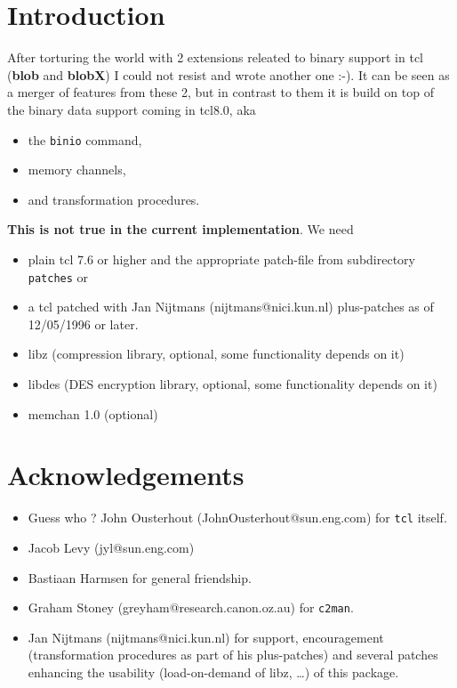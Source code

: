 \def\strong#1{{\bf #1}}
\def\lang#1{{\tt #1}}
\def\file#1{{\tt #1}}
\def\arg#1{{\tt $<$#1$>$}}
\def\trf{\strong {trf}}
\def\blob{\strong {blob}}
\def\blobx{\strong {blobX}}
\def\tcl{\lang {tcl}}
\def\cmd#1{{\tt #1}}
\def\opt#1{{\tt #1}}
\def\man#1{{\tt #1}}
\def\lib#1{{\tt #1}}

\def\version{1.0}

\tableofcontents

\chapter {Introduction}
After torturing the world with 2 extensions releated to binary support
in tcl (\blob{} and \blobx{}) I could not resist and wrote another
one :-). It can be seen as a merger of features from these 2, but in
contrast to them it is build on top of the binary data support coming
in tcl8.0, aka

\begin{itemize}
\item	the \cmd{binio} command,
\item	memory channels,
\item	and transformation procedures.
\end{itemize}

\strong {This is not true in the current implementation}. We need

\begin{itemize}
\item	plain tcl 7.6 or higher and the appropriate patch-file from
	subdirectory \file {patches} or

\item	a tcl patched with Jan Nijtmans (nijtmans@nici.kun.nl)
	plus-patches as of 12/05/1996 or later.

\item	libz (compression library, optional, some functionality depends on it)
\item	libdes (DES encryption library, optional, some functionality depends on it)
\item	memchan 1.0 (optional)
\end{itemize}


\chapter {Acknowledgements}

\begin {itemize}\Large
\item	Guess who ? John Ousterhout (JohnOusterhout@sun.eng.com) for
	\tcl {} itself. 
\item	Jacob Levy (jyl@sun.eng.com)
\item	Bastiaan Harmsen for general friendship.
\item	Graham Stoney (greyham@research.canon.oz.au) for \cmd {c2man}.
\item	Jan Nijtmans (nijtmans@nici.kun.nl) for support, encouragement
	(transformation procedures as part of his plus-patches) and
	several patches enhancing the usability (load-on-demand of
	libz, \dots{}) of this package.
\end   {itemize}

